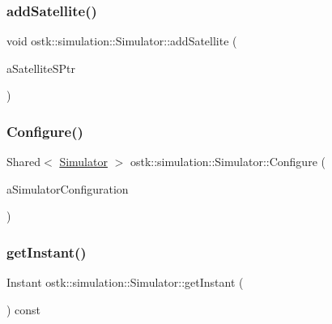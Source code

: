 \subsubsection{\texorpdfstring{add\+Satellite()}{addSatellite()}}
{\footnotesize\ttfamily void ostk\+::simulation\+::\+Simulator\+::add\+Satellite (\begin{DoxyParamCaption}\item[{const Shared$<$ \hyperlink{classostk_1_1simulation_1_1_satellite}{Satellite} $>$ \&}]{a\+Satellite\+S\+Ptr }\end{DoxyParamCaption})}

\mbox{\label{classostk_1_1simulation_1_1_simulator_ad95b067abdc0a5ddf348897161af46f1}} 
\subsubsection{\texorpdfstring{Configure()}{Configure()}}
{\footnotesize\ttfamily Shared$<$ \hyperlink{classostk_1_1simulation_1_1_simulator}{Simulator} $>$ ostk\+::simulation\+::\+Simulator\+::\+Configure (\begin{DoxyParamCaption}\item[{const \hyperlink{structostk_1_1simulation_1_1_simulator_configuration}{Simulator\+Configuration} \&}]{a\+Simulator\+Configuration }\end{DoxyParamCaption})\hspace{0.3cm}{\ttfamily [static]}}

\mbox{\label{classostk_1_1simulation_1_1_simulator_a64483af631b1f905850bb8b366f6fb0a}} 
\subsubsection{\texorpdfstring{get\+Instant()}{getInstant()}}
{\footnotesize\ttfamily Instant ostk\+::simulation\+::\+Simulator\+::get\+Instant (\begin{DoxyParamCaption}{ }\end{DoxyParamCaption}) const}

